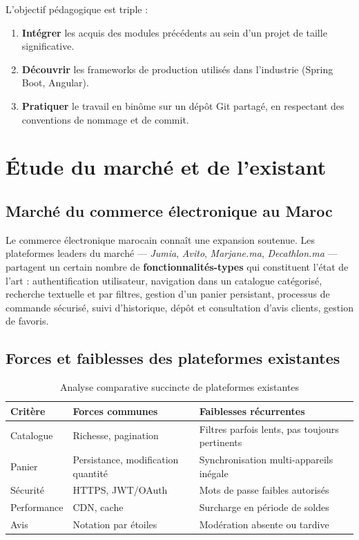 \documentclass[11pt,a4paper,oneside]{report}
\begin{document}
L'objectif pédagogique est triple :
\begin{enumerate}
  \item \textbf{Intégrer} les acquis des modules précédents au sein d'un
    projet de taille significative.
  \item \textbf{Découvrir} les frameworks de production utilisés dans
    l'industrie (Spring Boot, Angular).
  \item \textbf{Pratiquer} le travail en binôme sur un dépôt Git partagé,
    en respectant des conventions de nommage et de commit.
\end{enumerate}

\section{Étude du marché et de l'existant}

\subsection{Marché du commerce électronique au Maroc}

Le commerce électronique marocain connaît une expansion soutenue.
Les plateformes leaders du marché — \textit{Jumia}, \textit{Avito},
\textit{Marjane.ma}, \textit{Decathlon.ma} — partagent un certain nombre de
\textbf{fonctionnalités-types} qui constituent l'état de l'art :
authentification utilisateur, navigation dans un catalogue catégorisé,
recherche textuelle et par filtres, gestion d'un panier persistant,
processus de commande sécurisé, suivi d'historique, dépôt et consultation
d'avis clients, gestion de favoris.

\subsection{Forces et faiblesses des plateformes existantes}

\begin{table}[htbp]
\centering
\caption{Analyse comparative succincte de plateformes existantes}
\label{tab:concurrents}
\small
\begin{tabularx}{\textwidth}{lXX}
\toprule
\textbf{Critère} & \textbf{Forces communes} & \textbf{Faiblesses récurrentes}\\
\midrule
Catalogue   & Richesse, pagination     & Filtres parfois lents, pas toujours pertinents \\
Panier      & Persistance, modification quantité & Synchronisation multi-appareils inégale \\
Sécurité    & HTTPS, JWT/OAuth         & Mots de passe faibles autorisés \\
Performance & CDN, cache               & Surcharge en période de soldes \\
Avis        & Notation par étoiles     & Modération absente ou tardive \\
\bottomrule
\end{tabularx}
\end{table}
\end{document}
